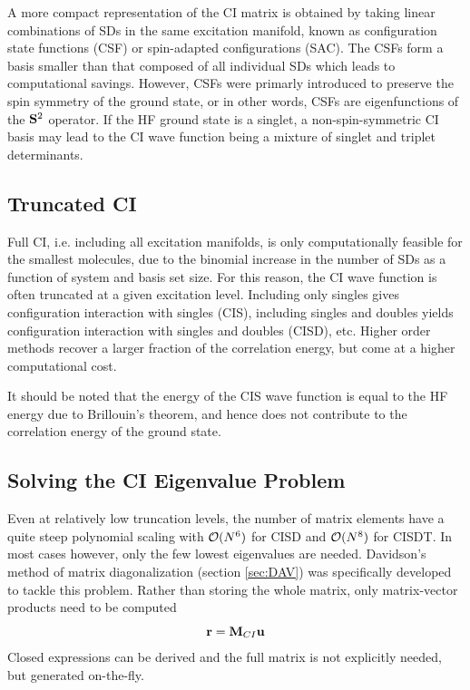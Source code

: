 A more compact representation of the CI matrix is obtained by taking linear combinations of SDs in the same excitation manifold, known as configuration state functions (CSF) or spin-adapted configurations (SAC). The CSFs form a basis smaller than that composed of all individual SDs which leads to computational savings. However, CSFs were primarly introduced to preserve the spin symmetry of the ground state, or in other words, CSFs are eigenfunctions of the $\mathbf{S}^2$ operator. If the HF ground state is a singlet, a non-spin-symmetric CI basis may lead to the CI wave function being a mixture of singlet and triplet determinants. 

\subsection{Truncated CI}

Full CI, i.e. including all excitation manifolds, is only computationally feasible for the smallest molecules, due to the binomial increase in the number of SDs as a function of system and basis set size. For this reason, the CI wave function is often truncated at a given excitation level. Including only singles gives configuration interaction with singles (CIS), including singles and doubles yields configuration interaction with singles and doubles (CISD), etc. Higher order methods recover a larger fraction of the correlation energy, but come at a higher computational cost.

It should be noted that the energy of the CIS wave function is equal to the HF energy due to Brillouin's theorem, and hence does not contribute to the correlation energy of the ground state.  

\subsection{Solving the CI Eigenvalue Problem}

Even at relatively low truncation levels, the number of matrix elements have a quite steep polynomial scaling with $\mathcal{O}(N^{6})$ for CISD and $\mathcal{O}(N^{8})$ for CISDT. In most cases however, only the few lowest eigenvalues are needed. Davidson's method of matrix diagonalization (section \ref{sec:DAV}) was specifically developed to tackle this problem. Rather than storing the whole matrix, only matrix-vector products need to be computed
\begin{equation}
\mathbf{r} = \mathbf{M}_{CI} \mathbf{u}
\end{equation}
\noindent Closed expressions can be derived and the full matrix is not explicitly needed, but generated on-the-fly. 

